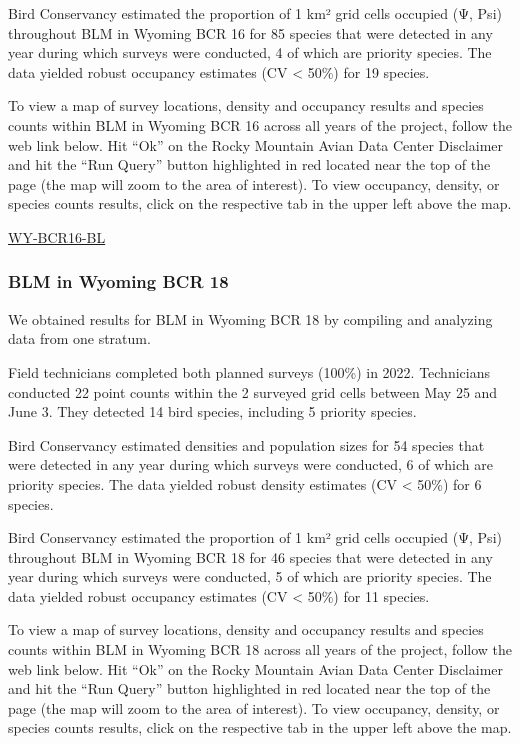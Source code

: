 \documentclass[
  letterpaper,
  DIV=11,
  numbers=noendperiod,
  oneside]{scrreprt}
\begin{document}
Bird Conservancy estimated the proportion of 1 km² grid cells occupied
(Ψ, Psi) throughout BLM in Wyoming BCR 16 for 85 species that were
detected in any year during which surveys were conducted, 4 of which are
priority species. The data yielded robust occupancy estimates (CV
\textless{} 50\%) for 19 species.

To view a map of survey locations, density and occupancy results and
species counts within BLM in Wyoming BCR 16 across all years of the
project, follow the web link below. Hit ``Ok'' on the Rocky Mountain
Avian Data Center Disclaimer and hit the ``Run Query'' button
highlighted in red located near the top of the page (the map will zoom
to the area of interest). To view occupancy, density, or species counts
results, click on the respective tab in the upper left above the map.

\href{http://www.rmbo.org/new_site/adc/QueryWindow.aspx\#N4IgzgLgTghhCuBbEAuABCA6gTQLQCEBhAJQEYA2AgGXX3igFMZ40B7AMzSpgDsATNAFleMAOYNEDHhBABfIA===}{WY-BCR16-BL}

\hypertarget{blm-in-wyoming-bcr-18}{%
\subsubsection{BLM in Wyoming BCR 18}\label{blm-in-wyoming-bcr-18}}

We obtained results for BLM in Wyoming BCR 18 by compiling and analyzing
data from one stratum.

Field technicians completed both planned surveys (100\%) in 2022.
Technicians conducted 22 point counts within the 2 surveyed grid cells
between May 25 and June 3. They detected 14 bird species, including 5
priority species.

Bird Conservancy estimated densities and population sizes for 54 species
that were detected in any year during which surveys were conducted, 6 of
which are priority species. The data yielded robust density estimates
(CV \textless{} 50\%) for 6 species.

Bird Conservancy estimated the proportion of 1 km² grid cells occupied
(Ψ, Psi) throughout BLM in Wyoming BCR 18 for 46 species that were
detected in any year during which surveys were conducted, 5 of which are
priority species. The data yielded robust occupancy estimates (CV
\textless{} 50\%) for 11 species.

To view a map of survey locations, density and occupancy results and
species counts within BLM in Wyoming BCR 18 across all years of the
project, follow the web link below. Hit ``Ok'' on the Rocky Mountain
Avian Data Center Disclaimer and hit the ``Run Query'' button
highlighted in red located near the top of the page (the map will zoom
to the area of interest). To view occupancy, density, or species counts
results, click on the respective tab in the upper left above the map.
\end{document}

